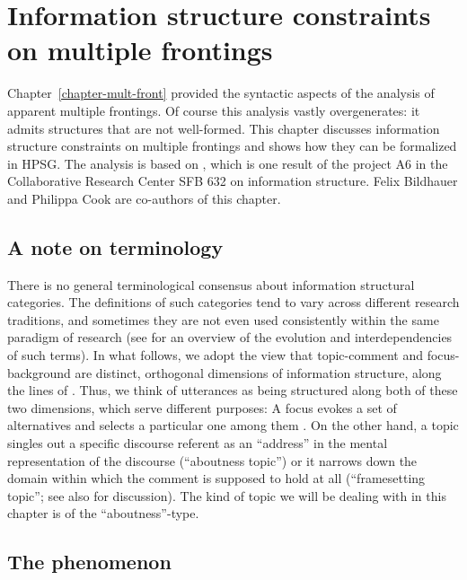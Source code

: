 \chapter{Information structure constraints on multiple frontings}
\label{chap-is}


Chapter~\ref{chapter-mult-front} provided the syntactic aspects of the analysis of apparent multiple frontings. Of course this analysis vastly overgenerates: it admits structures that are not well-formed. This chapter discusses information structure constraints on multiple frontings and shows how they can be formalized in HPSG. The analysis is based on , which is one result of the project A6 in the Collaborative Research Center SFB 632 on information structure. Felix Bildhauer and Philippa Cook are co-authors of this chapter.

\section{A note on terminology}

There is no general terminological consensus about information structural categories. The definitions of such categories tend to vary across different research traditions, and sometimes they are not even used consistently within the same paradigm of research (see \citealp{KruijffSteedman2003} for an overview of the evolution and interdependencies of such terms). In what follows, we adopt the view that topic-comment and focus-background are distinct, orthogonal dimensions of information structure, along the lines of \cite{Krifka2007a-u}. Thus, we think of utterances as being structured along both of these two dimensions, which serve different purposes: A focus evokes a set of alternatives and selects a particular one among them \citep{Rooth85a-u,Rooth92a-u}. On the other hand, a topic singles out a specific discourse referent as an ``address'' in the mental representation of the discourse (``aboutness topic'') or it narrows down the domain within which the comment is supposed to hold at all (``framesetting topic''; see also \citealp{Jacobs2001a-u-platte} for discussion). The kind of topic we will be dealing with in this chapter is of the ``aboutness''-type. 



\section{The phenomenon}



